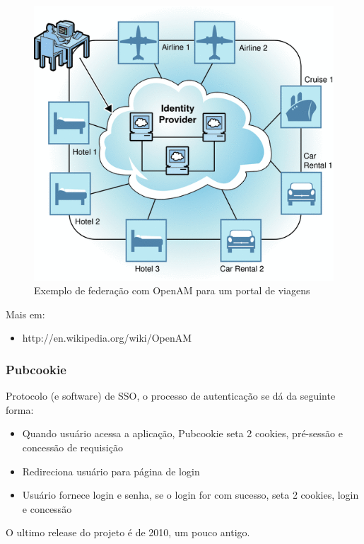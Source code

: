 \documentclass[11pt]{article}
\begin{document}
\begin{figure}[h]
\center
\includegraphics[scale=0.5]{opensso.png}
\caption{Exemplo de federação com OpenAM para um portal de viagens}
\label{fig:opensso}
\end{figure}

Mais em:
\begin{itemize}
  \item{http://en.wikipedia.org/wiki/OpenAM}
\end{itemize}

\subsubsection{Pubcookie}

Protocolo (e software) de SSO, o processo de autenticação se dá da seguinte
forma:

\begin{itemize}
  \item{Quando usuário acessa a aplicação, Pubcookie seta 2 cookies, pré-sessão e concessão de requisição}
  \item{Redireciona usuário para página de login}
  \item{Usuário fornece login e senha, se o login for com sucesso, seta 2 cookies, login e concessão}
\end{itemize}

O ultimo release do projeto é de 2010, um pouco antigo.
\end{document}
